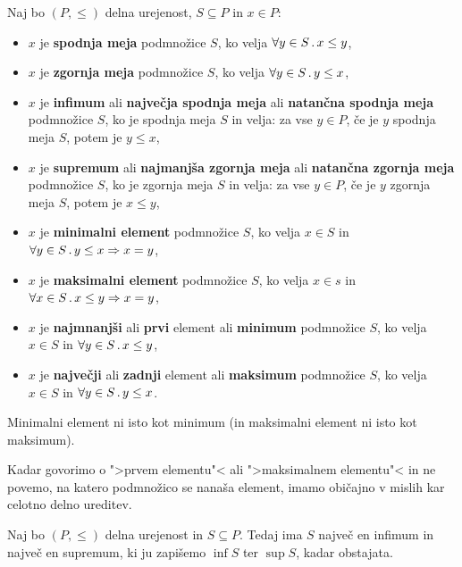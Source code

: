 \begin{definicija}
  Naj bo $(P, {\leq})$ delna urejenost, $S \subseteq P$ in $x \in P$:
  \begin{itemize}

  \item $x$ je \textbf{spodnja meja} podmnožice $S$, ko velja $\forall y \in S \,.\, x \leq y$,

  \item $x$ je \textbf{zgornja meja} podmnožice $S$, ko velja $\forall y \in S \,.\, y \leq x$,

  \item $x$ je \textbf{infimum} ali \textbf{največja spodnja meja} ali \textbf{natančna spodnja meja} podmnožice $S$, ko je spodnja meja $S$ in velja: za vse $y \in P$, če je $y$ spodnja meja
    $S$, potem je $y \leq x$,

  \item $x$ je \textbf{supremum} ali \textbf{najmanjša zgornja meja} ali \textbf{natančna zgornja meja} podmnožice $S$, ko je zgornja meja $S$ in velja: za vse $y \in P$, če je $y$ zgornja meja $S$, potem je $x \leq y$,

  \item $x$ je \textbf{minimalni element} podmnožice $S$, ko velja $x \in S$ in $\forall y \in S \,.\, y \leq x \Rightarrow x = y$,

  \item $x$ je \textbf{maksimalni element} podmnožice $S$, ko velja $x \in s$ in
      $\forall x \in S \,.\, x \leq y \Rightarrow x = y$,

  \item $x$ je \textbf{najmnanjši} ali \textbf{prvi} element ali \textbf{minimum} podmnožice $S$, ko velja $x \in S$ in $\forall y \in S \,.\, x \leq y$,

  \item $x$ je \textbf{največji} ali \textbf{zadnji} element ali \textbf{maksimum} podmnožice $S$, ko velja $x \in S$ in $\forall y \in S \,.\, y \leq x$.
\end{itemize}
\end{definicija}

\begin{opomba}
  Minimalni element ni isto kot minimum (in maksimalni element ni isto kot maksimum).
\end{opomba}

Kadar govorimo o ">prvem elementu"< ali ">maksimalnem elementu"< in ne povemo, na
katero podmnožico se nanaša element, imamo običajno v mislih kar celotno delno
ureditev.

\begin{izrek}
  Naj bo $(P, {\leq})$ delna urejenost in $S \subseteq P$. Tedaj ima $S$ največ en
  infimum in največ en supremum, ki ju zapišemo $\inf S$ ter $\sup S$, kadar obstajata.
\end{izrek}

